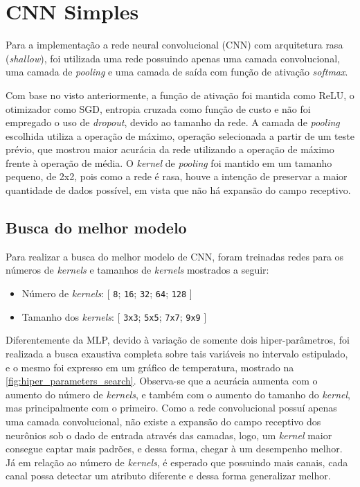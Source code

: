 \clearpage
\section{CNN Simples}

Para a implementação a rede neural convolucional (CNN) com arquitetura rasa (\textit{shallow}), foi utilizada uma rede possuindo apenas uma camada convolucional, uma camada de \textit{pooling} e uma camada de saída com função de ativação \textit{softmax}.

Com base no visto anteriormente, a função de ativação foi mantida como ReLU, o otimizador como SGD, entropia cruzada como função de custo e não foi empregado o uso de \textit{dropout}, devido ao tamanho da rede. A camada de \textit{pooling} escolhida utiliza a operação de máximo, operação selecionada a partir de um teste prévio, que mostrou maior acurácia da rede utilizando a operação de máximo frente à operação de média. O \textit{kernel} de \textit{pooling} foi mantido em um tamanho pequeno, de 2x2, pois como a rede é rasa, houve a intenção de preservar a maior quantidade de dados possível, em vista que não há expansão do campo receptivo.

\subsection{Busca do melhor modelo}

Para realizar a busca do melhor modelo de CNN, foram treinadas redes para os números de \textit{kernels} e tamanhos de \textit{kernels} mostrados a seguir:

\begin{itemize}
	\item Número de \textit{kernels}: [ \texttt{8}; \texttt{16}; \texttt{32}; \texttt{64}; \texttt{128} ]
	\item Tamanho dos \textit{kernels}: [ \texttt{3x3}; \texttt{5x5}; \texttt{7x7}; \texttt{9x9} ]
\end{itemize}

Diferentemente da MLP, devido à variação de somente dois hiper-parâmetros, foi realizada a busca exaustiva completa sobre tais variáveis no intervalo estipulado, e o mesmo foi expresso em um gráfico de temperatura, mostrado na \autoref{fig:hiper_parameters_search}. Observa-se que a acurácia aumenta com o aumento do número de \textit{kernels}, e também com o aumento do tamanho do \textit{kernel}, mas principalmente com o primeiro. Como a rede convolucional possuí apenas uma camada convolucional, não existe a expansão do campo receptivo dos neurônios sob o dado de entrada através das camadas, logo, um \textit{kernel} maior consegue captar mais padrões, e dessa forma, chegar à um desempenho melhor. Já em relação ao número de \textit{kernels}, é esperado que possuindo mais canais, cada canal possa detectar um atributo diferente e dessa forma generalizar melhor.

